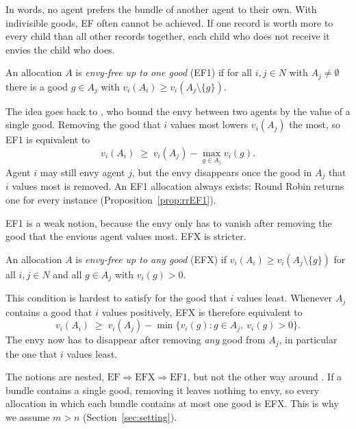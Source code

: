 In words, no agent prefers the bundle of another agent to their own. With indivisible goods, EF
often cannot be achieved. If one record is worth more to every child than all other records
together, each child who does not receive it envies the child who does.

\begin{definition}
An allocation $A$ is \textit{envy-free up to one good} (EF1) if for all $i,j\in N$ with
$A_j\neq\emptyset$ there is a good $g\in A_j$ with $v_i(A_i)\geq v_i(A_j\setminus\{g\})$.
\end{definition}

The idea goes back to \textcite{lipton2004}, who bound the envy between two agents by the value of
a single good. Removing the good that $i$ values most lowers $v_i(A_j)$ the most, so EF1 is
equivalent to
\[
  v_i(A_i)\;\geq\; v_i(A_j)-\max_{g\in A_j} v_i(g).
\]
Agent $i$ may still envy agent $j$, but the envy disappears once the good in $A_j$ that $i$ values
most is removed. An EF1 allocation always exists: Round Robin returns one for every instance
(Proposition~\ref{prop:rrEF1}).

EF1 is a weak notion, because the envy only has to vanish after removing the good that the envious
agent values most. EFX is stricter.

\begin{definition}\label{def:efx}
An allocation $A$ is \textit{envy-free up to any good} (EFX) if
$v_i(A_i)\geq v_i(A_j\setminus\{g\})$ for all $i,j\in N$ and all $g\in A_j$ with $v_i(g)>0$.
\end{definition}

This condition is hardest to satisfy for the good that $i$ values least. Whenever $A_j$ contains a
good that $i$ values positively, EFX is therefore equivalent to
\[
  v_i(A_i)\;\geq\; v_i(A_j)-\min\{v_i(g) : g\in A_j,\ v_i(g)>0\}.
\]
The envy now has to disappear after removing \emph{any} good from $A_j$, in particular the one that
$i$ values least. 

The notions are nested, $\mathrm{EF}\Rightarrow\mathrm{EFX}\Rightarrow
\mathrm{EF1}$, but not the other way around \parencite[p.~8]{amanatidis2023survey}. If a bundle
contains a single good, removing it leaves nothing to envy, so every allocation in which each bundle
contains at most one good is EFX. This is why we assume $m>n$ (Section~\ref{sec:setting}).

